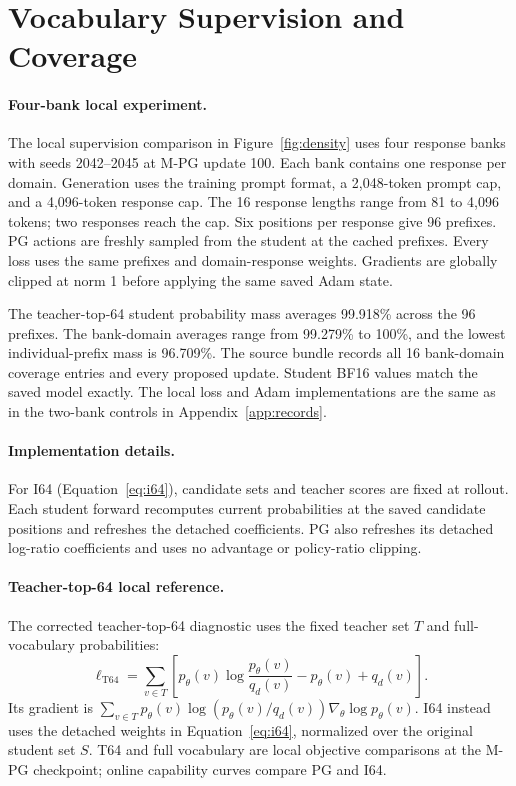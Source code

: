 \section{Vocabulary Supervision and Coverage}
\label{app:losses}

\paragraph{Four-bank local experiment.}
The local supervision comparison in Figure~\ref{fig:density} uses four response banks with seeds 2042--2045 at M-PG update 100. Each bank contains one response per domain. Generation uses the training prompt format, a 2,048-token prompt cap, and a 4,096-token response cap. The 16 response lengths range from 81 to 4,096 tokens; two responses reach the cap. Six positions per response give 96 prefixes. PG actions are freshly sampled from the student at the cached prefixes. Every loss uses the same prefixes and domain-response weights. Gradients are globally clipped at norm 1 before applying the same saved Adam state.

The teacher-top-64 student probability mass averages 99.918\% across the 96 prefixes. The bank-domain averages range from 99.279\% to 100\%, and the lowest individual-prefix mass is 96.709\%. The source bundle records all 16 bank-domain coverage entries and every proposed update. Student BF16 values match the saved model exactly. The local loss and Adam implementations are the same as in the two-bank controls in Appendix~\ref{app:records}.


\paragraph{Implementation details.}
For I64 (Equation~\ref{eq:i64}), candidate sets and teacher scores are fixed at rollout. Each student forward recomputes current probabilities at the saved candidate positions and refreshes the detached coefficients. PG also refreshes its detached log-ratio coefficients and uses no advantage or policy-ratio clipping.

\paragraph{Teacher-top-64 local reference.}
The corrected teacher-top-64 diagnostic uses the fixed teacher set $T$ and full-vocabulary probabilities:
\begin{equation}
\ell_{\mathrm{T64}}=\sum_{v\in T}\left[p_\theta(v)\log\frac{p_\theta(v)}{q_d(v)}-p_\theta(v)+q_d(v)\right].
\label{eq:t64}
\end{equation}
Its gradient is $\sum_{v\in T}p_\theta(v)\log(p_\theta(v)/q_d(v))\nabla_\theta\log p_\theta(v)$. I64 instead uses the detached weights in Equation~\ref{eq:i64}, normalized over the original student set $S$. T64 and full vocabulary are local objective comparisons at the M-PG checkpoint; online capability curves compare PG and I64.


